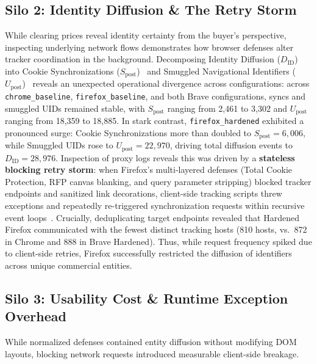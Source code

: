\subsection{Silo 2: Identity Diffusion \& The Retry Storm}
\label{subsec:silo_network}

While clearing prices reveal identity certainty from the buyer's perspective, inspecting underlying network flows demonstrates how browser defenses alter tracker coordination in the background.
Decomposing Identity Diffusion ($D_{\text{ID}}$) into Cookie Synchronizations ($S_{\text{post}}$)~\cite{papadopoulos2019cookie} and Smuggled Navigational Identifiers ($U_{\text{post}}$)~\cite{randall2022measuring} reveals an unexpected operational divergence across configurations: across \texttt{chrome\_baseline}, \texttt{firefox\_baseline}, and both Brave configurations, syncs and smuggled UIDs remained stable, with $S_{\text{post}}$ ranging from 2,461 to 3,302 and $U_{\text{post}}$ ranging from 18,359 to 18,885.
In stark contrast, \texttt{firefox\_hardened} exhibited a pronounced surge: Cookie Synchronizations more than doubled to $S_{\text{post}} = 6,006$, while Smuggled UIDs rose to $U_{\text{post}} = 22,970$, driving total diffusion events to $D_{\text{ID}} = 28,976$. 
Inspection of proxy logs reveals this was driven by a \textbf{stateless blocking retry storm}: when Firefox's multi-layered defenses (Total Cookie Protection, RFP canvas blanking, and query parameter stripping) blocked tracker endpoints and sanitized link decorations, client-side tracking scripts threw exceptions and repeatedly re-triggered synchronization requests within recursive event loops~\cite{iqbal2020adgraph}. 
Crucially, deduplicating target endpoints revealed that Hardened Firefox communicated with the fewest distinct tracking hosts (810 hosts, vs.\ 872 in Chrome and 888 in Brave Hardened). Thus, while request frequency spiked due to client-side retries, Firefox successfully restricted the diffusion of identifiers across unique commercial entities.
\subsection{Silo 3: Usability Cost \& Runtime Exception Overhead}
\label{subsec:silo_usability}

While normalized defenses contained entity diffusion without modifying DOM layouts, blocking network requests introduced measurable client-side breakage.


